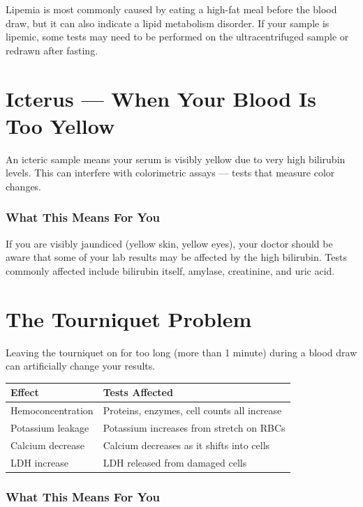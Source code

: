 Lipemia is most commonly caused by eating a high-fat meal before the blood draw, but it can also indicate a lipid metabolism disorder. If your sample is lipemic, some tests may need to be performed on the ultracentrifuged sample or redrawn after fasting.

\clearpage
\section{Icterus --- When Your Blood Is Too Yellow}

An icteric sample means your serum is visibly yellow due to very high bilirubin levels. This can interfere with colorimetric assays --- tests that measure color changes.

\subsubsection{What This Means For You}

If you are visibly jaundiced (yellow skin, yellow eyes), your doctor should be aware that some of your lab results may be affected by the high bilirubin. Tests commonly affected include bilirubin itself, amylase, creatinine, and uric acid.

\clearpage
\section{The Tourniquet Problem}

Leaving the tourniquet on for too long (more than 1 minute) during a blood draw can artificially change your results.

\begin{longtable}{@{}p{4.5cm}p{10.5cm}@{}}
\toprule
\textbf{Effect} & \textbf{Tests Affected} \\
\midrule
Hemoconcentration & Proteins, enzymes, cell counts all increase \\
Potassium leakage & Potassium increases from stretch on RBCs \\
Calcium decrease & Calcium decreases as it shifts into cells \\
LDH increase & LDH released from damaged cells \\
\bottomrule
\end{longtable}

\subsubsection{What This Means For You}

